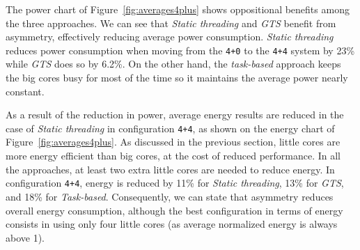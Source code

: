The power chart of Figure~\ref{fig:averages4plus} shows oppositional benefits among the three approaches. We can see that \emph{Static threading} and \emph{GTS} benefit from asymmetry, effectively reducing average power consumption.
\emph{Static threading} reduces power consumption when moving from the \texttt{4+0} to the \texttt{4+4} system by 23\% while \emph{GTS} does so by 6.2\%.
On the other hand, the \emph{task-based} approach keeps the big cores busy for most of the time so it maintains the average power nearly constant.






As a result of the reduction in power, average energy results are reduced in the case of 
\emph{Static threading} in configuration \texttt{4+4}, as shown on the energy chart of 
Figure~\ref{fig:averages4plus}. As discussed in the previous section, little cores are more energy 
efficient than big cores, at the cost of reduced performance. In all the approaches, at least two 
extra little cores are needed to reduce energy. In configuration \texttt{4+4}, energy is reduced by 
11\% for \emph{Static threading}, 13\% for \emph{GTS}, and 18\% for \emph{Task-based}. Consequently, 
we can state that asymmetry reduces overall energy consumption, although the best configuration in 
terms of energy consists in using only four little cores (as average normalized energy is always 
above 1).

